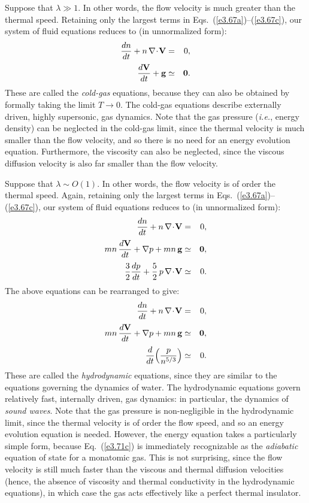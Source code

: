 Suppose that $\lambda\gg 1$. In other words, the flow velocity is much
greater than the thermal speed. Retaining only the largest terms in Eqs.~(\ref{e3.67a})--(\ref{e3.67c}),
our system of fluid equations reduces to (in unnormalized form):
\begin{eqnarray}
\frac{dn}{dt} + n\,\nabla\!\cdot\!{\bf V} &=& 0,\\[0.5ex]
\frac{d{\bf V}}{dt} + {\bf g} &\simeq& {\bf 0}.
\end{eqnarray}
These are called the {\em cold-gas}\/ equations, because they can also
be obtained by formally taking the limit $T\rightarrow 0$. The cold-gas
 equations describe
externally driven, highly supersonic, gas dynamics.
Note that  the gas pressure ({\em i.e.}, energy density) 
can be neglected in the cold-gas limit, since the thermal velocity is much
smaller than the flow velocity, and so there is no need for an energy evolution equation. Furthermore, the 
viscosity can also be neglected, since the
viscous diffusion velocity  is also far smaller than the
flow velocity.

Suppose that $\lambda\sim O(1)$. In other words, the flow velocity is of order the
thermal speed. Again, retaining only the largest terms in Eqs.~(\ref{e3.67a})--(\ref{e3.67c}),
our system of fluid equations reduces to (in unnormalized form):
\begin{eqnarray}
\frac{dn}{dt} + n\,\nabla\!\cdot\!{\bf V} &=& 0,\\[0.5ex]
m n\,\frac{d {\bf V}}{dt} + \nabla p + mn\,{\bf g}
& \simeq& {\bf 0},\\[0.5ex]
\frac{3}{2}\frac{d p}{dt} + \frac{5}{2}\,p\,\nabla\!\cdot\!{\bf V}
 &\simeq& 0.
\end{eqnarray}
The above  equations can be rearranged to give:
\begin{eqnarray}
\frac{dn}{dt} + n\,\nabla\!\cdot\!{\bf V} &=& 0,\\[0.5ex]
m n\,\frac{d {\bf V}}{dt} + \nabla p + mn\,{\bf g}
& \simeq& {\bf 0},\\[0.5ex]
\frac{d}{dt}\!\left(\frac{p}{n^{5/3}}\right) 
 &\simeq& 0.\label{e3.71c}
\end{eqnarray}
These are called the {\em hydrodynamic}\/ equations, since they are similar to the
equations governing the dynamics of water. The hydrodynamic equations
govern relatively fast, internally driven, 
gas dynamics: in particular, the dynamics of {\em sound waves}.
Note that the gas pressure is non-negligible in the
hydrodynamic limit,  since the
thermal velocity is of  order  the flow speed, and so
 an energy evolution equation is needed. However, the
energy equation takes a particularly simple form, because
Eq.~(\ref{e3.71c}) is immediately recognizable as the {\em adiabatic}\/ equation
of state for a monatomic gas. This is not surprising, since the
flow velocity is still much faster than the viscous and thermal diffusion
velocities (hence, the absence of viscosity and thermal conductivity in the
hydrodynamic equations), in which case the gas acts effectively like a perfect
thermal insulator. 

